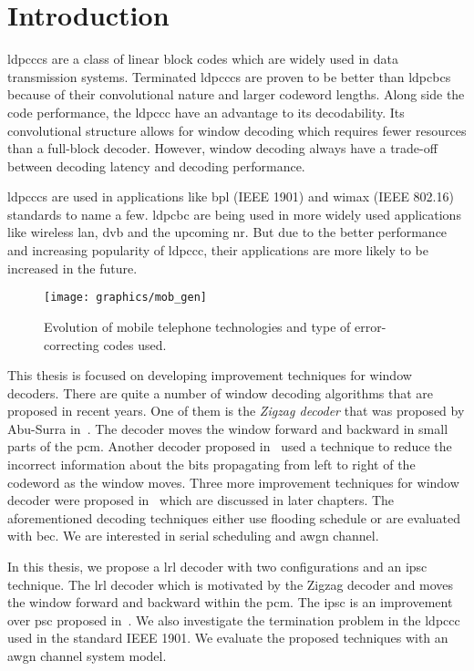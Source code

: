 \chapter{Introduction}
\glspl{ldpccc} are a class of linear block codes which are widely used in data transmission systems. Terminated \glspl{ldpccc} are proven to be better than \glspl{ldpcbc} because of their convolutional nature and larger codeword lengths. Along side the code performance, the \gls{ldpccc} have an advantage to its decodability. Its convolutional structure allows for window decoding which requires fewer resources than a full-block decoder. However, window decoding always have a trade-off between decoding latency and decoding performance.

\glspl{ldpccc} are used in applications like \gls{bpl} (IEEE 1901) and \gls{wimax} (IEEE 802.16) standards to name a few. \gls{ldpcbc} are being used in more widely used applications like wireless \gls{lan}, \gls{dvb} and the upcoming \gls{nr}. But due to the better performance and increasing popularity of \gls{ldpccc}, their applications are more likely to be increased in the future.
\begin{figure}[htbp]
  \centering
  \texttt{[image: graphics/mob\_gen]}
  \caption{Evolution of mobile telephone technologies and type of error-correcting codes used.}
  \label{fig:mob_gen}
\end{figure}

This thesis is focused on developing improvement techniques for window decoders. There are quite a number of window decoding algorithms that are proposed in recent years. One of them is the \emph{Zigzag decoder} that was proposed by Abu-Surra in~\cite{Shadi2015}. The decoder moves the window forward and backward in small parts of the \gls{pcm}. Another decoder proposed in~\cite{Kang2018} used a technique to reduce the incorrect information about the bits propagating from left to right of the codeword as the window moves. Three more improvement techniques for window decoder were proposed in~\cite{Ali2018} which are discussed in later chapters. The aforementioned decoding techniques either use flooding schedule or are evaluated with \gls{bec}. We are interested in serial scheduling and \gls{awgn} channel.

In this thesis, we propose a \gls{lrl} decoder with two configurations and an \gls{ipsc} technique. The \gls{lrl} decoder which is motivated by the Zigzag decoder and moves the window forward and backward within the \gls{pcm}. The \gls{ipsc} is an improvement over \gls{psc} proposed in~\cite{Kang2018}. We also investigate the termination problem in the \gls{ldpccc} used in the standard IEEE 1901. We evaluate the proposed techniques with an \gls{awgn} channel system model.

